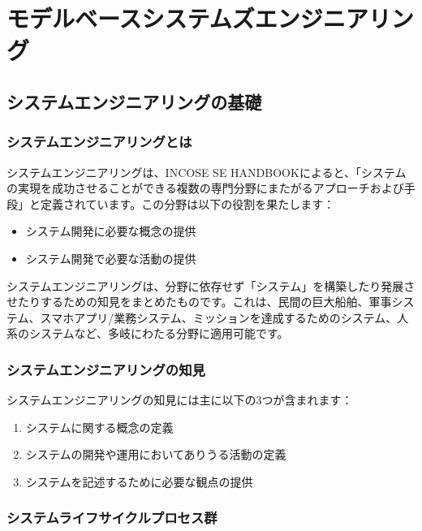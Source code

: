 \chapter{モデルベースシステムズエンジニアリング}
\label{chap4}

\section{システムエンジニアリングの基礎}

\subsection{システムエンジニアリングとは}

システムエンジニアリングは、INCOSE SE HANDBOOKによると、「システムの実現を成功させることができる複数の専門分野にまたがるアプローチおよび手段」と定義されています。この分野は以下の役割を果たします：

\begin{itemize}
    \item システム開発に必要な概念の提供
    \item システム開発で必要な活動の提供
\end{itemize}

システムエンジニアリングは、分野に依存せず「システム」を構築したり発展させたりするための知見をまとめたものです。これは、民間の巨大船舶、軍事システム、スマホアプリ/業務システム、ミッションを達成するためのシステム、人系のシステムなど、多岐にわたる分野に適用可能です。

\subsection{システムエンジニアリングの知見}

システムエンジニアリングの知見には主に以下の3つが含まれます：

\begin{enumerate}
    \item システムに関する概念の定義
    \item システムの開発や運用においてありうる活動の定義
    \item システムを記述するために必要な観点の提供
\end{enumerate}

\subsection{システムライフサイクルプロセス群}

